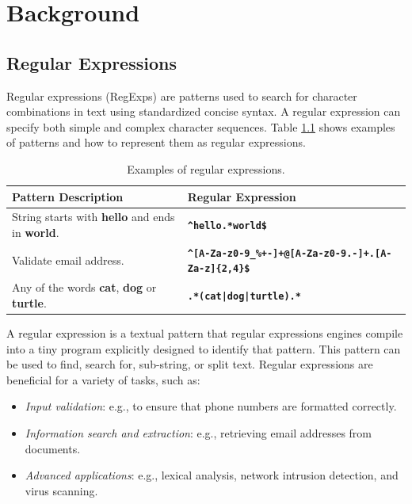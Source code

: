 \chapter{Background}\label{chapter:background}

\section{Regular Expressions}
Regular expressions (RegExps) are patterns used to search for character combinations in text using standardized concise syntax. A regular expression can specify both simple and complex character sequences. Table \ref{tab:regexsamp} shows examples of patterns and how to represent them as regular expressions.

{\renewcommand{\arraystretch}{1.6}%
\begin{table}[H]
\centering
\begin{adjustbox}{width=1.1\textwidth,center=\textwidth}
\small
\begin{tabular}{|l|l|}
\hline
Pattern Description       & Regular Expression  \\
\hline
String starts with \textbf{hello} and ends in \textbf{world}. & \texttt{\textbf{\^{}hello.*world\$}} \\
\hline
Validate email address. & \texttt{\textbf{\^{}[A-Za-z0-9\_\%+-]+@[A-Za-z0-9.-]+.[A-Za-z]\{2,4\}\$}} \\
\hline
Any of the words \textbf{cat}, \textbf{dog} or \textbf{turtle}. & \texttt{\textbf{.*(cat|dog|turtle).*}}\\
\hline
\end{tabular}
\end{adjustbox}
\caption{Examples of regular expressions.}\label{tab:regexsamp}
\end{table}}

A regular expression is a textual pattern that regular expressions engines compile into a tiny program explicitly designed to identify that pattern. This pattern can be used to find, search for, sub-string, or split text. Regular expressions are beneficial for a variety of tasks, such as:
 \begin{itemize}
     \item \textit{Input validation}: e.g., to ensure that phone numbers are formatted correctly.
     \item \textit{Information search and extraction}: e.g., retrieving email addresses from documents. \item \textit{Advanced applications}: e.g., lexical analysis, network intrusion detection, and virus scanning.
 \end{itemize}

